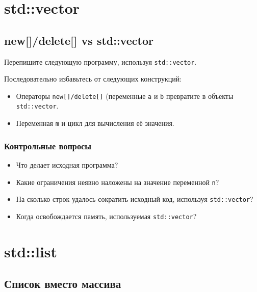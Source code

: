 \documentclass[10pt,twoside,openany]{book}
\begin{document}

\chapter{std::vector}

\section{new[]/delete[] vs std::vector}

Перепишите следующую программу, используя {\tt std::vector}.

Последовательно избавьтесь от следующих конструкций:
\begin{itemize}
    \item Операторы {\tt new[]/delete[]} (переменные {\tt a} и {\tt b}
          превратите в объекты {\tt std::vector}.
    \item Переменная {\tt m} и цикл для вычисления её значения.
\end{itemize}



\subsection*{Контрольные вопросы}

\begin{itemize}
    \item Что делает исходная программа?
    \item Какие ограничения неявно наложены на значение переменной {\tt n}?
    \item На сколько строк удалось сократить исходный код, используя {\tt std::vector}?
    \item Когда освобождается память, используемая {\tt std::vector}?
\end{itemize}


\chapter{std::list}

\section{Список вместо массива}
\end{document}
